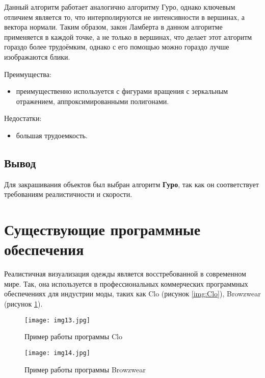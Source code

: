 Данный алгоритм работает аналогично алгоритму Гуро, однако
ключевым отличием является то, что интерполируются не интенсивности в вершинах,
а вектора нормали. Таким образом, закон Ламберта в данном алгоритме
применяется в каждой точке, а не только в вершинах, что делает этот алгоритм
гораздо более трудоёмким, однако с его помощью можно гораздо лучше изображаются
блики.

Преимущества:
\begin{itemize}
    \item преимущественно используется с фигурами вращения с зеркальным
        отражением, аппроксимированными полигонами.
\end{itemize}

Недостатки:
\begin{itemize}
    \item большая трудоемкость.
\end{itemize}

\subsection*{Вывод}

Для закрашивания объектов был выбран алгоритм \textbf{Гуро}, так как он
соответствует требованиям реалистичности и скорости.

\section{Существующие программные обеспечения}

Реалистичная визуализация одежды является восстребованной в современном мире.
Так, она используется в профессиональных коммерческих программных обеспечениях
для индустрии моды, таких как Clo\cite{site01} (рисунок \ref{img:Clo}),
Browzwear\cite{site02} (рисунок \ref{img:Browzwear}).

\begin{figure}[ht!]
\begin{center}
    \begin{minipage}[h]{0.4\linewidth}
        \begin{center}
            \texttt{[image: img13.jpg]}
            \caption{Пример работы программы Clo}
            \label{img:Clo}
        \end{center}
    \end{minipage}
    \hspace{2ex}
    \begin{minipage}[h]{0.4\linewidth}
        \begin{center}
            \texttt{[image: img14.jpg]}
            \caption{Пример работы программы Browzwear}
            \label{img:Browzwear}
        \end{center}
    \end{minipage}
\end{center}
\end{figure}

